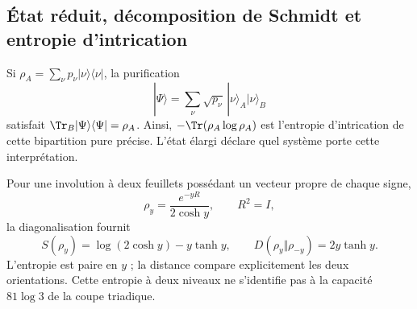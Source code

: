 

\pagebreak %
\subsection{État réduit, décomposition de Schmidt et entropie d'intrication}
Si $\rho_A=\sum_\nu p_\nu|\nu\rangle\langle\nu|$,
la purification
\[
|\Psi\rangle=\sum_\nu\sqrt{p_\nu}\,
|\nu\rangle_A|\nu\rangle_B
\]
satisfait $\Tr_B|\Psi\rangle\langle\Psi|=\rho_A$.
Ainsi, $-\Tr(\rho_A\log\rho_A)$ est l'entropie d'intrication
de cette bipartition pure précise. L'état élargi déclare
quel système porte cette interprétation.

Pour une involution à deux feuillets possédant un vecteur propre de chaque signe,
\[
\rho_y=\frac{e^{-yR}}{2\cosh y},\qquad R^2=I,
\]
la diagonalisation fournit
\[
S(\rho_y)=\log(2\cosh y)-y\tanh y,\qquad
D(\rho_y\Vert\rho_{-y})=2y\tanh y.
\]
L'entropie est paire en $y$ ; la distance compare explicitement
les deux orientations. Cette entropie à deux niveaux ne s'identifie pas
à la capacité $81\log3$ de la coupe triadique.
